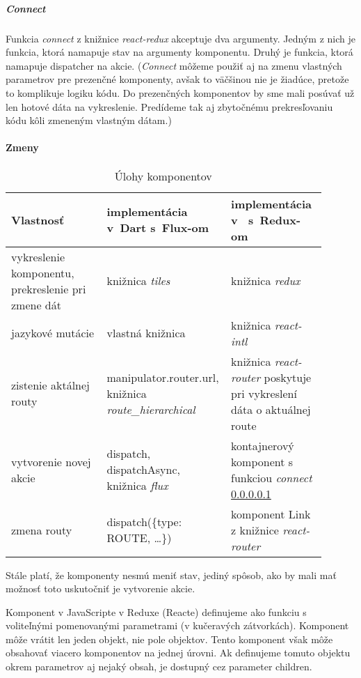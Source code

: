 \subparagraph{Connect}
\label{func:connect}
Funkcia \emph{connect} z knižnice \emph{react-redux} \cite{react-redux} akceptuje dva argumenty. Jedným z nich je funkcia, ktorá namapuje stav na argumenty komponentu. Druhý je funkcia, ktorá namapuje dispatcher na akcie. %
(\emph{Connect} môžeme použiť aj na zmenu vlastných parametrov pre prezenčné komponenty, avšak to väčšinou nie je žiadúce, pretože to komplikuje logiku kódu. Do prezenčných komponentov by sme mali posúvať už len hotové dáta na vykreslenie. Predídeme tak aj zbytočnému prekresľovaniu kódu kôli zmeneným vlastným dátam.)

\paragraph{Zmeny}
\NEW{}
\begin{table}
  \caption{Úlohy komponentov}
  \label{table:components}
  \begin{tabular}{| p{0.3\linewidth} | p{0.3\linewidth} | p{0.3\linewidth} |}
   \hline
     Vlastnosť & implementácia v~Dart s~Flux-om & implementácia v~\JS{} s~Redux-om \\
    \hline
    \hline
     vykreslenie komponentu, prekreslenie pri zmene dát & 
     knižnica \emph{tiles} &
     knižnica \emph{redux} \\
    \hline
     jazykové mutácie & 
     vlastná knižnica & 
     knižnica \emph{react-intl} \\
    \hline
     zistenie aktálnej routy & 
     manipulator.router.url, knižnica \emph{route\_hierarchical} & 
     knižnica \emph{react-router} poskytuje pri vykreslení dáta o aktuálnej route \\
    \hline
     vytvorenie novej akcie & 
     dispatch, dispatchAsync, knižnica \emph{flux} & 
     kontajnerový komponent s funkciou \emph{connect} \ref{func:connect} \\
    \hline
     zmena routy & 
     dispatch(\{type: ROUTE, \ldots\}) & 
     komponent Link z knižnice \emph{react-router} \\
    \hline
   \end{tabular}
\end{table}
%

Stále platí, že komponenty nesmú meniť stav, jediný spôsob, ako by mali mať možnosť toto uskutočniť je vytvorenie akcie.

Komponent v JavaScripte v Reduxe (Reacte) %
definujeme ako funkciu s voliteľnými pomenovanými parametrami (v kučeravých zátvorkách). %
Komponent môže vrátit len jeden objekt, nie pole objektov. Tento komponent však môže obsahovať viacero komponentov na jednej úrovni.
Ak definujeme tomuto objektu okrem parametrov aj nejaký obsah, je dostupný cez parameter children.%

